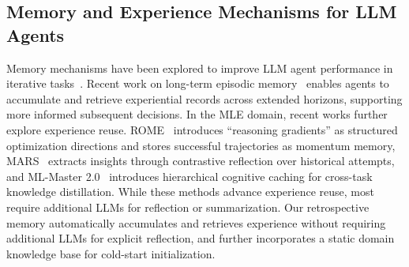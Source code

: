 \subsection{Memory and Experience Mechanisms for LLM Agents}
Memory mechanisms have been explored to improve LLM agent performance in iterative tasks~\citep{zhang2025memsurvey}. Recent work on long-term episodic memory~\citep{xu2026amem} enables agents to accumulate and retrieve experiential records across extended horizons, supporting more informed subsequent decisions. In the MLE domain, recent works further explore experience reuse. ROME~\citep{zhang2026rome} introduces ``reasoning gradients'' as structured optimization directions and stores successful trajectories as momentum memory, MARS~\citep{chen2026mars} extracts insights through contrastive reflection over historical attempts, and ML-Master 2.0~\citep{zhu2026mlmaster2} introduces hierarchical cognitive caching for cross-task knowledge distillation. While these methods advance experience reuse, most require additional LLMs for reflection or summarization. Our retrospective memory automatically accumulates and retrieves experience 
without requiring additional LLMs for explicit reflection, and further incorporates a static domain knowledge base for cold-start initialization.

